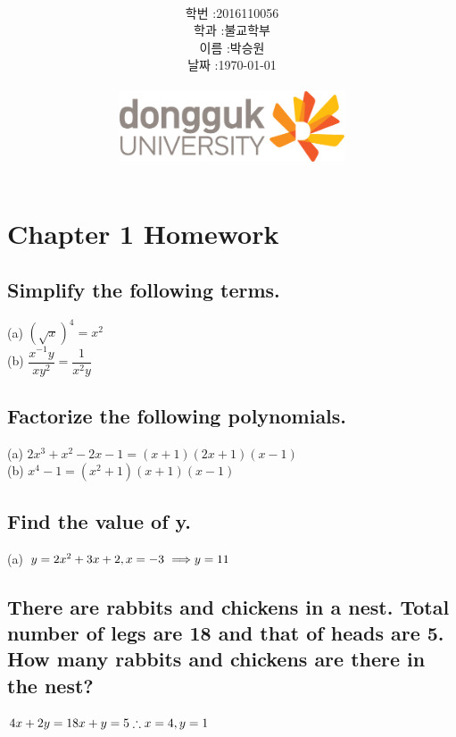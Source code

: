 \documentclass[12pt,a4paper]{article}
\title{
	\centering
	\pgfornament[width=12cm,color=teal]{84}\\
	\vspace{1cm}
	\fontsize{50}{50} \selectfont {정보통신 수학 및 실습\\3월 3주차 Homework}\\
		\pgfornament[width=12cm,color=teal]{88}\\
	\vfill}
\author{
	\LARGE
	\begin{tabular}{rl}
		\hline
		학번 : & 2016110056\\ 
		학과 : & 불교학부 \\
		이름 : & 박승원\\
		날짜 : & \today\\
		\hline
	\end{tabular}\vspace{2cm}
	\\
\includegraphics[width=0.5\textwidth]{logo.jpg}
	}
\date{}
\begin{document}
\maketitle
{}
\noindent
\lstset{language=matlab, columns=flexible, tabsize=4, frame=shadowbox, showstringspaces=false, breaklines=true, upquote=true, basicstyle=\normalsize}
\newpage
\section{Chapter 1 Homework}

\subsection{Simplify the following terms.}

(a) $(\sqrt{x})^4 = x^2$\\
(b) $\dfrac{x^{-1}y}{xy^2}=\dfrac{1}{x^2y}$

\subsection{Factorize the following polynomials.}
(a) $2x^3+x^2-2x-1 = (x+1)(2x+1)(x-1)$\\
(b) $x^4-1=(x^2+1)(x+1)(x-1)$

\subsection{Find the value of y. }
(a) $y=2x^2+3x+2, x=-3\\
\		\Longrightarrow y=11$

\subsection{There are rabbits and chickens in a nest.  Total number of legs
	are 18 and that of heads are 5.  How many rabbits and chickens
	are there in the nest?}  
$4x+2y=18\\x+y=5\\
\therefore x=4, y=1$
\newpage
\end{document}
